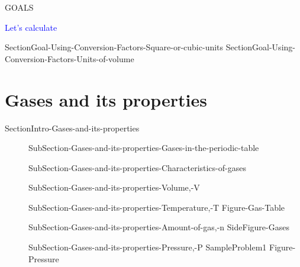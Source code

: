 \documentclass[main.tex]{subfiles}
\newcommand\chapterlabel{ChMIX-biomoleculesinsolution}\setcounter{figurenewcounter}{0}\setcounter{tablenewcounter}{0}\setcounter{formulanewcounter}{0}
\begin{document}
\begin{marginfigure}
\begin{mytcbox}{GOALS}
\begin{center}\textcolor{blue}{\faFlash Let's calculate} \end{center}
\begin{enumerate}[label=\protect\circled{\color{white}\arabic*}]
{SectionGoal-Using-Conversion-Factors-Square-or-cubic-units}
{SectionGoal-Using-Conversion-Factors-Units-of-volume}
\end{enumerate}
			 				 




\end{mytcbox}
\vspace{1cm}
\end{marginfigure}%






\renewcommand\chapterlabel{Ch-Gas}



\section{\faEnvira Gases and its properties} {SectionIntro-Gases-and-its-properties}
\sloppy \begin{description}
\item[]  {SubSection-Gases-and-its-properties-Gases-in-the-periodic-table}
\item[]  {SubSection-Gases-and-its-properties-Characteristics-of-gases}
 \item[] {SubSection-Gases-and-its-properties-Volume,-V}
 \item[]{SubSection-Gases-and-its-properties-Temperature,-T}
 {Figure-Gas-Table}
 \item[] {SubSection-Gases-and-its-properties-Amount-of-gas,-n}
 {SideFigure-Gases}
\item[] {SubSection-Gases-and-its-properties-Pressure,-P}
{SampleProblem1}
 {Figure-Pressure}
\end{description}
\end{document}
